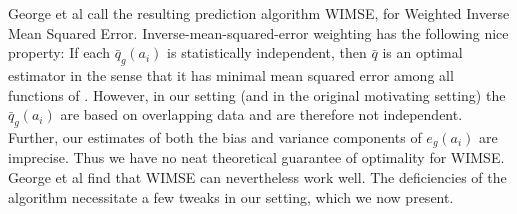 George et al call the resulting prediction algorithm WIMSE, for Weighted Inverse Mean Squared Error.  Inverse-mean-squared-error weighting has the following nice property: If each $\bar{q}_{g}(a_i)$ is statistically independent, then $\bar{q}$ is an optimal estimator in the sense that it has minimal mean squared error among all functions of \cite{}.  However, in our setting (and in the original motivating setting) the $\bar{q}_{g}(a_i)$ are based on overlapping data and are therefore not independent.  Further, our estimates of both the bias and variance components of $e_{g}(a_i)$ are imprecise.  Thus we have no neat theoretical guarantee of optimality for WIMSE.  George et al find that WIMSE can nevertheless work well.  The deficiencies of the algorithm necessitate a few tweaks in our setting, which we now present.

\begin{figure}[t!]
\centering
{}
\label{fig:acs-comparison}
\end{figure}


